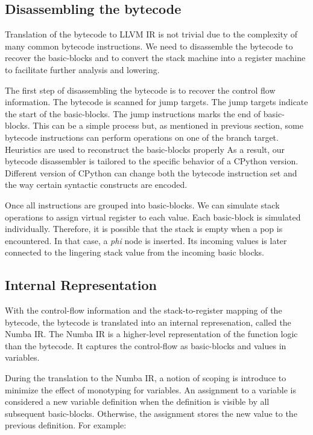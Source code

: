 \documentclass{acm_proc_article-sp}
\begin{document}
\subsection{Disassembling the bytecode}

Translation of the bytecode to LLVM IR is not trivial due to the
complexity of many common bytecode instructions.  We need to disassemble
the bytecode to recover the basic-blocks and to convert the stack machine into
a register machine to facilitate further analysis and lowering.

The first step of disassembling the bytecode is to recover the control flow
information. The bytecode is scanned for jump targets. The jump targets
indicate the start of the basic-blocks.  The jump instructions marks the
end of basic-blocks. This can be a simple process but, as mentioned in previous
section, some bytecode instructions can perform  operations on one of the
branch target.  Heuristics are used to reconstruct the basic-blocks properly
As a result, our bytecode disassembler is tailored to the specific behavior of
a CPython version.  Different version of CPython can change both the bytecode
instruction set and the way certain syntactic constructs are encoded.

Once all instructions are grouped into basic-blocks. We can simulate stack
operations to assign virtual register to each value.  Each basic-block is
simulated individually. Therefore, it is possible that the stack is empty when
a pop is encountered. In that case, a \textit{phi} node is inserted.
Its incoming values is later connected to the lingering stack value from the
incoming basic blocks.

\subsection{Internal Representation}

With the control-flow information and the stack-to-register mapping
of the bytecode, the bytecode is translated into an internal represenation,
called the Numba IR. The Numba IR is a higher-level representation of the
function logic than the bytecode. It captures the control-flow as basic-blocks
and values in variables.

During the translation to the Numba IR, a notion of scoping is introduce to
minimize the effect of monotyping for variables. An assignment to a variable
is considered a new variable definition when the definition is visible by all
subsequent basic-blocks. Otherwise, the assignment stores the new value to
the previous definition.  For example:
\end{document}
